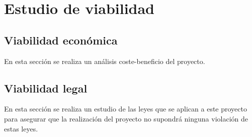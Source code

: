 \section{Estudio de viabilidad}
\subsection{Viabilidad económica}
En esta sección se realiza un análisis coste-beneficio del proyecto.
\subsection{Viabilidad legal}
En esta sección se realiza un estudio de las leyes que se aplican a este proyecto para asegurar que la realización del proyecto no supondrá ninguna violación de estas leyes. 


